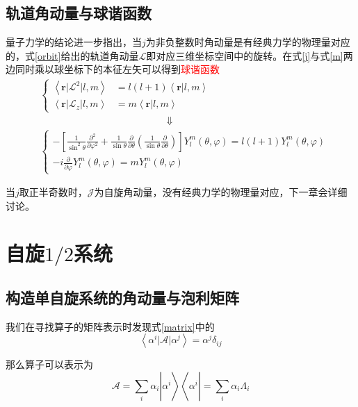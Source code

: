 \documentclass[UTF8,12pt]{article}
\providecommand\Ket[1]{\left|\right. #1 \left.\right\rangle}
\providecommand\Bra[1]{\left\langle\right. #1 \left.\right|}
\providecommand\Bracket[2]{\left\langle #1 \big| #2 \right\rangle}
\providecommand\BraCket[3]{\left\langle #1 \big| #2 \big| #3 \right\rangle}
\numberwithin{equation}{subsection}
\providecommand{\empR}[1]{\textcolor{red}{#1}}
\providecommand{\sumL}{\sum\limits}
\begin{document}
	\subsection{轨道角动量与球谐函数}
	量子力学的结论进一步指出，当$j$为非负整数时角动量是有经典力学的物理量对应的，式\ref{orbit}给出的轨道角动量$\mathcal L$即对应三维坐标空间中的旋转。在式\ref{j}与式\ref{m}两边同时乘以球坐标下的本征左矢可以得到\empR{球谐函数}
	\begin{equation}
		\nonumber
		\begin{aligned}
			&\begin{cases}
				\BraCket{\boldsymbol{r}}{\mathcal L^2}{l,m}&=l(l+1)\Bracket{\boldsymbol{r}}{l,m}\\
				\BraCket{\boldsymbol{r}}{\mathcal L_z}{l,m}&=m\Bracket{\boldsymbol{r}}{l,m}
			\end{cases}\\		
		&\hspace{13em}\Downarrow\\
		&\begin{cases}
			-\left[\frac{1}{\sin^2\theta}\frac{\partial^2}{\partial\varphi^2}+\frac{1}{\sin\theta}\frac{\partial}{\partial\theta}\left(\frac{1}{\sin\theta}\frac{\partial}{\partial\theta}\right)\right]Y^m_l(\theta,\varphi)=l(l+1)Y^m_l(\theta,\varphi)\\
			-i\frac{\partial}{\partial\varphi}Y^m_l(\theta,\varphi)=mY^m_l(\theta,\varphi)
		\end{cases}
		\end{aligned}
	\end{equation}
	
	当$j$取正半奇数时，$\mathcal J$为自旋角动量，没有经典力学的物理量对应，下一章会详细讨论。

\section{自旋$1/2$系统}
	\subsection{构造单自旋系统的角动量与泡利矩阵}
	我们在寻找算子的矩阵表示时发现式\ref{matrix}中的$$\BraCket{\alpha^i}{\mathcal A}{\alpha^j} = \alpha^j\delta_{ij}$$
	
	那么算子可以表示为\begin{equation}
		\mathcal A = \sumL_i\alpha_i\Ket{\alpha^i}\Bra{\alpha^i}=\sumL_i\alpha_i\Lambda_i
		\label{ei-projector}
	\end{equation}
	
\end{document}
